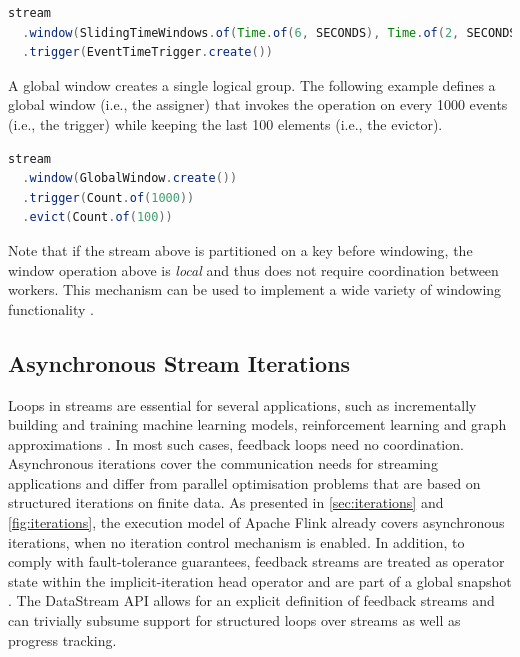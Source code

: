\documentclass[11pt]{article}
\begin{document}
\begin{lstlisting}[language=Java]
stream
  .window(SlidingTimeWindows.of(Time.of(6, SECONDS), Time.of(2, SECONDS))
  .trigger(EventTimeTrigger.create())
\end{lstlisting}

\noindent A global window creates a single logical group. The following example defines a global window (i.e., the assigner) that invokes the operation on every 1000 events (i.e., the trigger) while keeping the last 100 elements (i.e., the evictor). 

\begin{lstlisting}[language=Java]
stream
  .window(GlobalWindow.create())
  .trigger(Count.of(1000))
  .evict(Count.of(100))
\end{lstlisting}

Note that if the stream above is partitioned on a key before  windowing, the window operation above is \textit{local} and thus does not require coordination between workers. This mechanism can be used to implement a wide variety of windowing functionality \cite{akidau2015dataflow}. 

\vspace{-3mm}
\subsection{Asynchronous Stream Iterations}
\label{sec:stream-iterations}
\vspace{-2mm}
Loops in streams are essential for several applications, such as incrementally building and training machine learning models, reinforcement learning and graph approximations \cite{feigenbaum2005graph,chandramouli2009fly}.
In most such cases, feedback loops need no coordination. Asynchronous iterations cover the communication needs for streaming applications and differ from parallel optimisation problems that are based on structured iterations on finite data. As presented in \autoref{sec:iterations} and \autoref{fig:iterations}, the execution model of Apache Flink already covers asynchronous iterations, when no iteration control mechanism is enabled. In addition, to comply with fault-tolerance guarantees, feedback streams are treated as operator state within the implicit-iteration head operator and are part of a global snapshot \cite{carbone2015lightweight}. The DataStream API allows for an explicit definition of feedback streams and can trivially subsume support for structured loops over streams\cite{murray2013naiad} as well as progress tracking\cite{chandramouli2009fly}.
\end{document}
